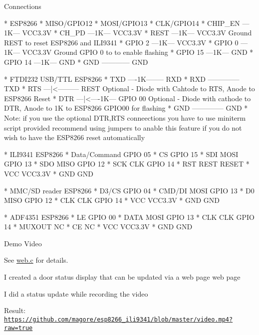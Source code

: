 \begin{DoxyParagraph}{Connections}
\begin{DoxyVerb}* ESP8266           
  * MISO/GPIO12 
  * MOSI/GPIO13
  * CLK/GPIO14
  * CHIP_EN ---1K--- VCC3.3V
  * CH_PD   ---1K--- VCC3.3V
  * REST    ---1K--- VCC3.3V   Ground REST to reset ESP8266 and ILI9341
  * GPIO  2 ---1K--- VCC3.3V
  * GPIO  0 ---1K--- VCC3.3V   Ground GPIO 0 to to enable flashing
  * GPIO 15 ---1K--- GND
  * GPIO 14 ---1K--- GND
  * GND ------------ GND

* FTDI232 USB/TTL      ESP8266
  * TXD ----1K--------  RXD
  * RXD --------------  TXD
  * RTS ---|<--------- REST    Optional - Diode with Cahtode to RTS, Anode to ESP8266 Reset
  * DTR ---|<----1K--- GPIO 00 Optional - Diode with cathode to DTR, Anode to 1K to ESP8266 GPIO00 for flashing
  * GND --------------  GND
  * Note: if you use the optional DTR,RTS conneections you have to use miniterm script provided
  recommend using jumpers to anable this feature if you do not wish to have the ESP8266 reset automatically

* ILI9341        ESP8266
  * Data/Command GPIO 05 
  * CS           GPIO 15
  * SDI    MOSI  GPIO 13
  * SDO    MISO  GPIO 12
  * SCK    CLK   GPIO 14 
  * RST    REST  RESET
  * VCC          VCC3.3V
  * GND          GND

* MMC/SD reader  ESP8266
  * D3/CS        GPIO 04 
  * CMD/DI MOSI  GPIO 13
  * D0     MISO  GPIO 12
  * CLK    CLK   GPIO 14
  * VCC          VCC3.3V
  * GND          GND

* ADF4351        ESP8266
  * LE           GPIO 00
  * DATA   MOSI  GPIO 13
  * CLK     CLK  GPIO 14
  * MUXOUT            NC
  * CE                NC
  * VCC          VCC3.3V
  * GND          GND
\end{DoxyVerb}

\end{DoxyParagraph}
\begin{DoxyParagraph}{Demo Video}

\begin{DoxyItemize}
\item See \hyperlink{web_8c}{web.\+c} for details.
\begin{DoxyItemize}
\item I created a door status display that can be updated via a web page web page
\item I did a status update while recording the video
\item Result\+: \href{https://github.com/magore/esp8266_ili9341/blob/master/video.mp4?raw=true}{\tt https\+://github.\+com/magore/esp8266\+\_\+ili9341/blob/master/video.\+mp4?raw=true}
\end{DoxyItemize}
\end{DoxyItemize}
\end{DoxyParagraph}
